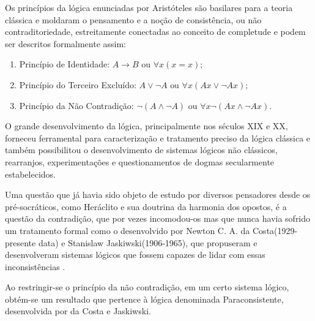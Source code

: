Os princípios da lógica enunciadas por Aristóteles são basilares para a teoria clássica e moldaram o pensamento e a noção de consistência, ou não contraditoriedade, estreitamente conectadas ao conceito de completude e podem ser descritos formalmente assim:


\begin{enumerate}
\item Princípio de Identidade: 
    \begin{math}
	A \rightarrow B 
	\textrm{ ou } 
	\forall x(x=x);
    \end{math}

\item Princípio do Terceiro Excluído:
    \begin{math}
	A \vee \neg A
	\textrm{ ou }
	\forall x(Ax \vee \neg Ax);
    \end{math}

\item Princípio da Não Contradição: 
    \begin{math}
	\neg (A \wedge \neg A)
	\textrm{ ou }
	\forall x\neg(Ax \wedge \neg Ax).
    \end{math}

\end{enumerate}

O grande desenvolvimento da lógica, 
principalmente nos séculos XIX e XX, 
forneceu ferramental para caracterização e 
tratamento preciso da lógica clássica 
e também possibilitou o desenvolvimento de sistemas lógicos não clássicos, 
rearranjos, experimentações e 
questionamentos de dogmas secularmente estabelecidos.

Uma questão que já havia sido objeto de estudo por diversos pensadores desde os pré-socráticos, 
como Heráclito e sua doutrina da harmonia dos opostos, 
é a questão da contradição, 
que por vezes incomodou-os 
mas que nunca havia sofrido um tratamento formal 
como o desenvolvido por 
Newton C. A. da Costa(1929-presente data) e 
Stanislaw Jaskiwski(1906-1965), 
que propuseram e desenvolveram sistemas lógicos que fossem capazes de lidar com essas inconsistências \cite{DecioKrause}. 

Ao restringir-se o princípio da não contradição, 
em um certo sistema lógico, 
obtém-se um resultado que pertence à lógica denominada Paraconsistente, 
desenvolvida por da Costa e Jaskiwski. 



